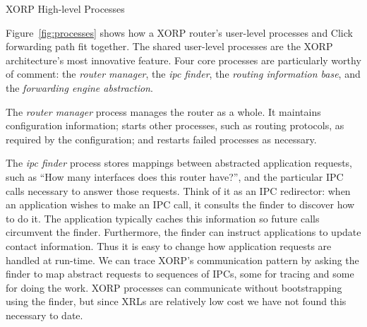 
\begin{floatingfigure}[l]{3.0in} %
\centerline{}
\caption{XORP High-level Processes}
\label{fig:processes}
\vspace{-0.1in}
\end{floatingfigure}

Figure~\ref{fig:processes} shows how a XORP router's user-level processes
and Click forwarding path fit together.
The shared user-level processes are the XORP architecture's most innovative
feature. Four core processes are particularly worthy of comment: the
\emph{router manager},
the \emph{ipc finder}, the \emph{routing information base}, and the 
\emph{forwarding engine abstraction}.  

The \emph{router manager}
process manages the router as a whole.  It maintains
configuration information; starts other processes, such as routing
protocols, as required by the configuration; and restarts failed
processes as necessary.

The \emph{ipc finder} process stores mappings between abstracted application
requests, such as ``How many interfaces does this router have?'', and the
particular IPC calls necessary to answer those requests.
Think of it as an IPC redirector:
when an application wishes to make an IPC
call, it consults the finder to discover how to do it.  The
application typically caches this information so future calls
circumvent the finder.  Furthermore, the finder can instruct
applications to update contact information.  Thus it is easy to change
how application requests are handled at run-time.  We
can trace XORP's communication pattern by asking the finder to map
abstract requests to sequences of IPCs, some for tracing and some for
doing the work.  XORP processes can communicate without
bootstrapping using the finder, but since XRLs are relatively low cost we
have not found this necessary to date.

